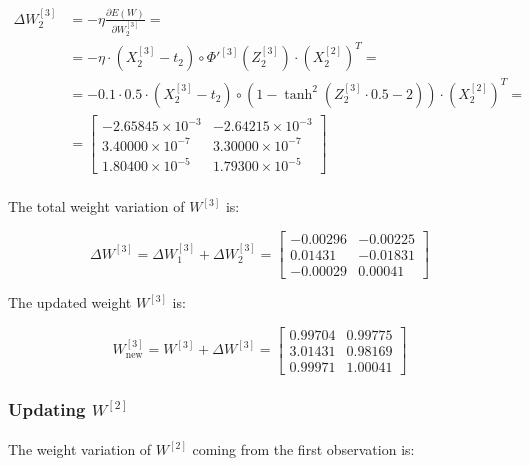 \documentclass{article}
\begin{document}
\begin{align*}
    \Delta W^{[3]}_2 &= - \eta \frac{\partial E(W)}{\partial W^{[3]}_2} = \\
    &= - \eta \cdot (X^{[3]}_2 - t_2) \circ \Phi'^{[3]}(Z^{[3]}_2)\cdot (X^{[2]}_2)^T =\\
    &= - 0.1 \cdot 0.5 \cdot (X^{[3]}_2 - t_2)  \circ \left( 1 - \tanh^2(Z^{[3]}_2 \cdot 0.5 - 2) \right) \cdot (X^{[2]}_2)^T = \\
    &= \begin{bmatrix} -2.65845\times 10^{-3} & -2.64215\times 10^{-3} \\   3.40000\times 10^{-7} &  3.30000\times 10^{-7} \\   1.80400\times 10^{-5} &  1.79300\times 10^{-5}  \end{bmatrix} \\
\end{align*}

The total weight variation of $W^{[3]}$ is:

\[ \Delta W^{[3]} = \Delta W^{[3]}_1 + \Delta W^{[3]}_2 =  \begin{bmatrix} -0.00296 & -0.00225 \\   0.01431 & -0.01831 \\  -0.00029 &  0.00041  \end{bmatrix} \]

The updated weight $W^{[3]}$ is:

\[ W^{[3]}_{\text{new}} = W^{[3]} + \Delta W^{[3]} = \begin{bmatrix} 0.99704 & 0.99775 \\  3.01431 & 0.98169 \\  0.99971 & 1.00041  \end{bmatrix} \]

\subsubsection*{Updating $W^{[2]}$}

\paragraph{} The weight variation of $W^{[2]}$ coming from the first observation is:
\end{document}
